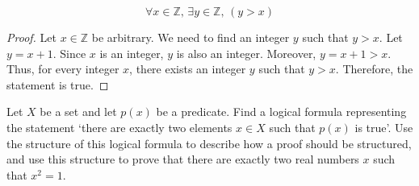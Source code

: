 \begin{mysolution}
    \[\forall x \in \mathbb{Z},\, \exists y \in \mathbb{Z},\, (y > x)\]
    \begin{proof}
        Let $x \in \mathbb{Z}$ be arbitrary. We need to find an integer $y$ such that $y > x$. Let $y = x + 1$. Since $x$ is an integer, $y$ is also an integer. Moreover, $y = x + 1 > x$. Thus, for every integer $x$, there exists an integer $y$ such that $y > x$. Therefore, the statement is true.
    \end{proof}
\end{mysolution}

\begin{chapex}
Let $X$ be a set and let $p(x)$ be a predicate. Find a logical formula representing the statement `there are exactly two elements $x \in X$ such that $p(x)$ is true'. Use the structure of this logical formula to describe how a proof should be structured, and use this structure to prove that there are exactly two real numbers $x$ such that $x^2=1$.
\end{chapex}

